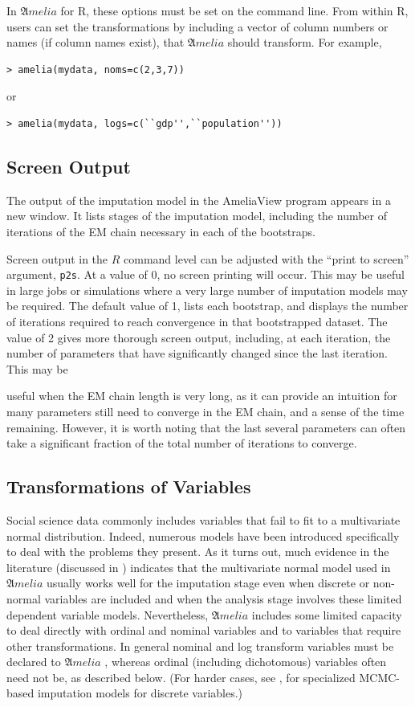 \documentclass[12pt,titlepage]{article}
\newcommand{\Amelia}{\ensuremath{\mathfrak Amelia} }
\begin{document}
In \Amelia for R, these options must be set on the command line.  From
within R, users can set the transformations by including a vector of
column numbers or names (if column names exist), that \Amelia should
transform.  For example,

\begin{verbatim}
> amelia(mydata, noms=c(2,3,7))
\end{verbatim}
or
\begin{verbatim}
> amelia(mydata, logs=c(``gdp'',``population''))
\end{verbatim}

\subsection{Screen Output}
The output of the imputation model in the AmeliaView program appears
in a new window.  It lists stages of the imputation model, including
the number of iterations of the EM chain necessary in each of the
bootstraps.

Screen output in the $R$ command level can be adjusted with the
``print to screen'' argument, \texttt{p2s}.  At a value of 0, no
screen printing will occur.  This may be useful in large jobs or
simulations where a very large number of imputation models may be
required.  The default value of 1, lists each bootstrap, and displays
the number of iterations required to reach convergence in that
bootstrapped dataset.  The value of 2 gives more thorough screen
output, including, at each iteration, the number of parameters that
have significantly changed since the last iteration.  This may be

useful when the EM chain length is very long, as it can provide an
intuition for many parameters still need to converge in the EM chain,
and a sense of the time remaining.  However, it is worth noting that
the last several parameters can often take a significant fraction of
the total number of iterations to converge.

\subsection{Transformations of Variables}
\label{sec:trans}

Social science data commonly includes variables that fail to fit to
a multivariate normal distribution. Indeed, numerous models have been
introduced specifically to deal with the problems they present.  As it
turns out, much evidence in the literature (discussed in
\citealt{KinHonJos01}) indicates that the multivariate normal model
used in ${\mathfrak Amelia}$ usually works well for the imputation
stage even when discrete or non-normal variables are included and when
the analysis stage involves these limited dependent variable models.
Nevertheless, ${\mathfrak Amelia}$ includes some limited capacity to
deal directly with ordinal and nominal variables and to variables that
require other transformations.  In general nominal and log transform
variables must be declared to \Amelia, whereas ordinal (including
dichotomous) variables often need not be, as described below.  (For
harder cases, see \citep{Schafer97}, for specialized MCMC-based imputation
models for discrete variables.)\nocite{KinHonJos01}
\end{document}
